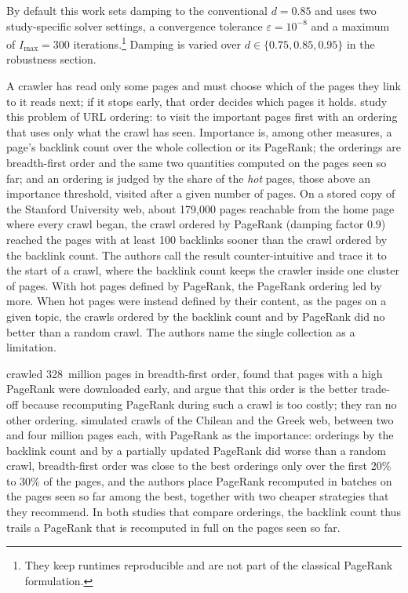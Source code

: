 By default this work sets damping to the conventional $d=0.85$ \parencite{page1999pagerank,langville2006pagerank} and uses two study-specific solver settings, a convergence tolerance $\varepsilon=10^{-8}$ and a maximum of $I_{\max}=300$ iterations.\footnote{They keep runtimes reproducible and are not part of the classical PageRank formulation.} Damping is varied over $d\in\{0.75,0.85,0.95\}$ in the robustness section.


A crawler has read only some pages and must choose which of the pages they link to it reads next; if it stops early, that order decides which pages it holds. \textcite{cho1998crawling} study this problem of URL ordering: to visit the important pages first with an ordering that uses only what the crawl has seen. Importance is, among other measures, a page's backlink count over the whole collection or its PageRank; the orderings are breadth-first order and the same two quantities computed on the pages seen so far; and an ordering is judged by the share of the \emph{hot} pages, those above an importance threshold, visited after a given number of pages. On a stored copy of the Stanford University web, about 179{,}000 pages reachable from the home page where every crawl began, the crawl ordered by PageRank (damping factor $0.9$) reached the pages with at least 100 backlinks sooner than the crawl ordered by the backlink count. The authors call the result counter-intuitive and trace it to the start of a crawl, where the backlink count keeps the crawler inside one cluster of pages. With hot pages defined by PageRank, the PageRank ordering led by more. When hot pages were instead defined by their content, as the pages on a given topic, the crawls ordered by the backlink count and by PageRank did no better than a random crawl. The authors name the single collection as a limitation.

\textcite{najork2001breadth} crawled 328~million pages in breadth-first order, found that pages with a high PageRank were downloaded early, and argue that this order is the better trade-off because recomputing PageRank during such a crawl is too costly; they ran no other ordering. \textcite{baezayates2005crawling} simulated crawls of the Chilean and the Greek web, between two and four million pages each, with PageRank as the importance: orderings by the backlink count and by a partially updated PageRank did worse than a random crawl, breadth-first order was close to the best orderings only over the first 20\% to 30\% of the pages, and the authors place PageRank recomputed in batches on the pages seen so far among the best, together with two cheaper strategies that they recommend. In both studies that compare orderings, the backlink count thus trails a PageRank that is recomputed in full on the pages seen so far.

